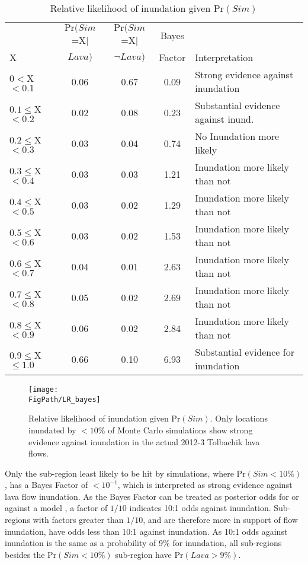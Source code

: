 		\begin{table}
			\centering
			\caption{Relative likelihood of inundation given $\text{Pr}(Sim)$}
			\begin{tabular}{l c c c l}
				\toprule
				 & $\text{Pr}(Sim$=X$|$ & $\text{Pr}(Sim$=X$|$ & Bayes & \citet{jeffreys1998theory}\\
				X & $Lava)$ & $\neg Lava)$ & Factor & Interpretation \\
				\midrule
				$0<$X$<0.1$ & 0.06 & 0.67 & 0.09 & Strong evidence against inundation\\
				$0.1\le$X$<0.2$ & 0.02 & 0.08 & 0.23 & Substantial evidence against inund.\\
				$0.2\le$X$<0.3$ & 0.03 & 0.04 & 0.74 & No Inundation more likely\\
				$0.3\le$X$<0.4$ & 0.03 & 0.03 & 1.21 & Inundation more likely than not\\
				$0.4\le$X$<0.5$ & 0.03 & 0.02 & 1.29 & Inundation more likely than not\\
				$0.5\le$X$<0.6$ & 0.03 & 0.02 & 1.53 & Inundation more likely than not\\
				$0.6\le$X$<0.7$ & 0.04 & 0.01 & 2.63 & Inundation more likely than not\\
				$0.7\le$X$<0.8$ & 0.05 & 0.02 & 2.69 & Inundation more likely than not\\
				$0.8\le$X$<0.9$ & 0.06 & 0.02 & 2.84 & Inundation more likely than not\\
				$0.9\le$X$\le 1.0$ & 0.66 & 0.10 & 6.93 & Substantial evidence for inundation\\
				\bottomrule
			\end{tabular}
			\label{tab_BFresults}
		\end{table}
		
		\begin{figure}[!h]
			\centering
			\texttt{[image: \\FigPath/LR\_bayes]}
			\caption[Relative likelihood of inundation given $\text{Pr}(Sim)$]{Relative likelihood of inundation given $\text{Pr}(Sim)$. Only locations inundated by $<10\%$ of Monte Carlo simulations show strong evidence against inundation in the actual 2012-3 Tolbachik lava flows.}
			\label{fig_bayesfactor}
		\end{figure}
		
		Only the sub-region least likely to be hit by simulations, where $\text{Pr}(Sim<10\%)$, has a Bayes Factor of $<10^{-1}$, which is interpreted as strong evidence against lava flow inundation. As the Bayes Factor can be treated as posterior odds for or against a model \citep{aspinall2003evidence}, a factor of $1/10$ indicates 10:1 odds against inundation. Sub-regions with factors greater than $1/10$, and are therefore more in support of flow inundation, have odds less than 10:1 against inundation. As 10:1 odds against inundation is the same as a probability of 9\% for inundation, all sub-regions besides the $\text{Pr}(Sim<10\%)$ sub-region have $\text{Pr}(Lava>9\%)$.
		


